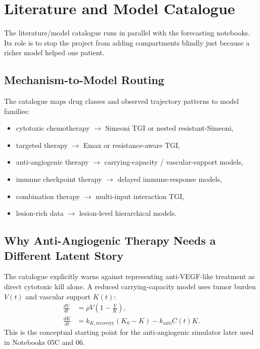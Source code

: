 \documentclass[11pt,a4paper]{article}
\begin{document}
\section{Literature and Model Catalogue}

The literature/model catalogue runs in parallel with the forecasting notebooks. Its role is to stop the project from adding compartments blindly just because a richer model helped one patient.

\subsection{Mechanism-to-Model Routing}

The catalogue maps drug classes and observed trajectory patterns to model families:
\begin{itemize}[leftmargin=2em]
    \item cytotoxic chemotherapy $\rightarrow$ Simeoni TGI or nested resistant-Simeoni,
    \item targeted therapy $\rightarrow$ Emax or resistance-aware TGI,
    \item anti-angiogenic therapy $\rightarrow$ carrying-capacity / vascular-support models,
    \item immune checkpoint therapy $\rightarrow$ delayed immune-response models,
    \item combination therapy $\rightarrow$ multi-input interaction TGI,
    \item lesion-rich data $\rightarrow$ lesion-level hierarchical models.
\end{itemize}

\subsection{Why Anti-Angiogenic Therapy Needs a Different Latent Story}

The catalogue explicitly warns against representing anti-VEGF-like treatment as direct cytotoxic kill alone. A reduced carrying-capacity model uses tumor burden $V(t)$ and vascular support $K(t)$:
\[
\begin{aligned}
    \frac{dV}{dt}&=\rho V\left(1-\frac{V}{K}\right),\\
    \frac{dK}{dt}&=k_{K,\mathrm{recovery}}(K_0-K)-k_{\mathrm{anti}}C(t)K.
\end{aligned}
\]
This is the conceptual starting point for the anti-angiogenic simulator later used in Notebooks 05C and 06.
\end{document}
